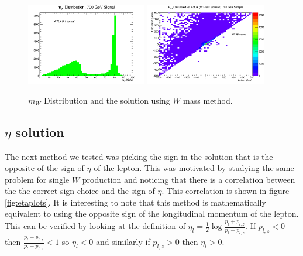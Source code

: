 \begin{figure}[!h]
\begin{center}
\includegraphics*[width=0.47\textwidth] {figures/nupz/wmassdist.png}
\includegraphics*[width=0.47\textwidth] {figures/nupz/wmass700.png}
	\caption{$m_{W}$ Distribution and the solution using $W$ mass method.}
\label{fig:wdist}
\end{center}
\end{figure}

\subsection{$\eta$ solution}
The next method we tested was picking the sign in the solution that is the opposite of the sign of $\eta$ of the lepton. This was motivated by studying the same problem for single $W$ production and noticing that there is a correlation between the the correct sign choice and the sign of $\eta$. This correlation is shown in figure \ref{fig:etaplots}. It is interesting to note that this method is mathematically equivalent to using the opposite sign of the longitudinal momentum of the lepton. This can be verified by looking at the definition of $\eta_{l} = \frac{1}{2} \log \frac{p_{l} + p_{l,z}}{p_{l} - p_{l,z}}$. If $p_{l,z} < 0$ then $\frac{p_{l} + p_{l,z}}{p_{l} - p_{l,z}} < 1$ so $\eta_{l} < 0$ and similarly if $p_{l,z} > 0$ then $\eta_{l} > 0$. 

